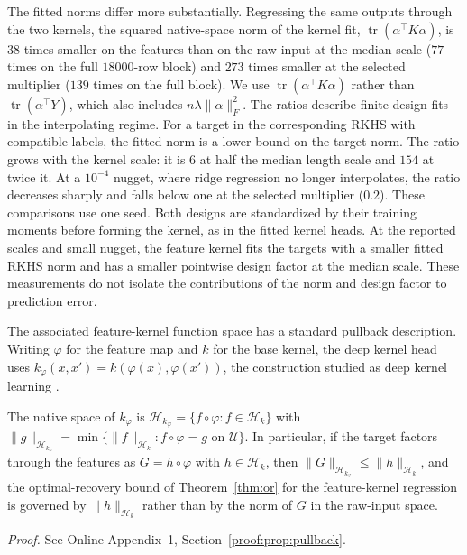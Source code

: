 \documentclass[twoside,11pt]{article}
\newcommand{\alignRatioNorm}{38}        %
\newcommand{\alignRatioLo}{6}           %
\newcommand{\alignRatioSel}{273}     %
\newcommand{\alignRatioFullSel}{139}  %
\newcommand{\alignRatioHeavy}{0.2}   %
\newcommand{\alignRatioHi}{154}         %
\newcommand{\alignRatioFull}{77}        %
\begin{document}
The fitted norms differ more substantially. Regressing the same outputs through
the two kernels, the squared native-space norm of the kernel fit,
$\operatorname{tr}(\alpha^\top K\alpha)$, is $\alignRatioNorm$ times
smaller on the features than on the raw input at the median scale
($\alignRatioFull$ times on the full $18000$-row block) and
$\alignRatioSel$ times smaller at the selected multiplier ($\alignRatioFullSel$ times on the
full block). We use $\operatorname{tr}(\alpha^\top K\alpha)$ rather than
$\operatorname{tr}(\alpha^\top Y)$, which also includes
$n\lambda\|\alpha\|_F^2$. The ratios describe finite-design fits in the
interpolating regime. For a target in the corresponding RKHS with
compatible labels, the fitted norm is a lower bound on the target norm.
The ratio grows with the kernel scale: it is $\alignRatioLo$ at half the
median length scale and $\alignRatioHi$ at twice it. At a $10^{-4}$
nugget, where ridge regression no longer interpolates, the ratio decreases
sharply and falls below one at the selected multiplier ($\alignRatioHeavy$).
These comparisons use one seed. Both designs are standardized by their
training moments before forming the kernel, as in the fitted kernel heads. At the reported scales and small nugget, the feature
kernel fits the targets with a smaller fitted RKHS norm and has a smaller
pointwise design factor at the median scale. These measurements do not
isolate the contributions of the norm and design factor to prediction error.

The associated feature-kernel function space has a standard pullback description.
Writing $\varphi$ for the feature map and $k$ for the base kernel, the deep
kernel head uses $k_\varphi(x,x')=k(\varphi(x),\varphi(x'))$, the construction
studied as deep kernel learning \citep{wilson2016deep,calandra2016manifold}.

\begin{proposition}\label{prop:pullback}
The native space of $k_\varphi$ is $\mathcal H_{k_\varphi}=\{f\circ\varphi:
f\in\mathcal H_k\}$ with
$\|g\|_{\mathcal H_{k_\varphi}}=\min\{\|f\|_{\mathcal H_k}: f\circ\varphi=g
\text{ on }\mathcal U\}$. In particular, if the target factors through the
features as $G=h\circ\varphi$ with $h\in\mathcal H_k$, then
$\|G\|_{\mathcal H_{k_\varphi}}\le\|h\|_{\mathcal H_k}$, and the
optimal-recovery bound of Theorem~\ref{thm:or} for the feature-kernel
regression is governed by $\|h\|_{\mathcal H_k}$ rather than by the norm of
$G$ in the raw-input space.
\end{proposition}
\noindent\emph{Proof.} See Online Appendix~1, Section~\ref{proof:prop:pullback}.
\end{document}
